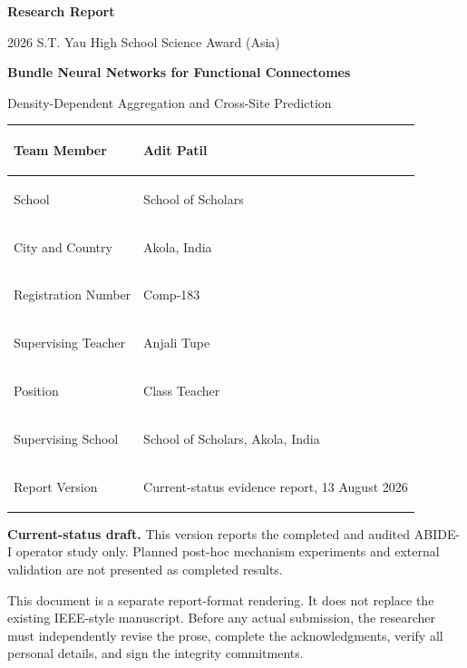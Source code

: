 \documentclass[11pt,a4paper]{article}
\newcommand{\draftnote}{\textbf{Current-status draft.} This version reports the completed and audited ABIDE-I operator study only. Planned post-hoc mechanism experiments and external validation are not presented as completed results.}
\begin{document}
\hypersetup{pageanchor=false}

\thispagestyle{empty}
\begin{center}
  {\Large\bfseries Research Report}\par
  \vspace{0.35em}
  {\large 2026 S.T. Yau High School Science Award (Asia)}\par
  \vspace{2.0cm}
  {\LARGE\bfseries Bundle Neural Networks for Functional Connectomes}\par
  \vspace{0.35em}
  {\Large Density-Dependent Aggregation and Cross-Site Prediction}\par
  \vspace{1.2cm}
\end{center}

\renewcommand{\arraystretch}{1.35}
\noindent\begin{tabularx}{\textwidth}{|>{\bfseries\raggedright\arraybackslash}p{3.6cm}|Y|}
\hline
Team Member & Adit Patil \\
\hline
School & School of Scholars \\
\hline
City and Country & Akola, India \\
\hline
Registration Number & Comp-183 \\
\hline
Supervising Teacher & Anjali Tupe \\
\hline
Position & Class Teacher \\
\hline
Supervising School & School of Scholars, Akola, India \\
\hline
Report Version & Current-status evidence report, 13 August 2026 \\
\hline
\end{tabularx}

\vfill
\noindent\begin{minipage}{\textwidth}
\small\color{muted}
\draftnote

This document is a separate report-format rendering. It does not replace the
existing IEEE-style manuscript. Before any actual submission, the researcher
must independently revise the prose, complete the acknowledgments,
verify all personal details, and sign the integrity commitments.
\end{minipage}
\clearpage

\hypersetup{pageanchor=true}
\setcounter{page}{1}
\end{document}
